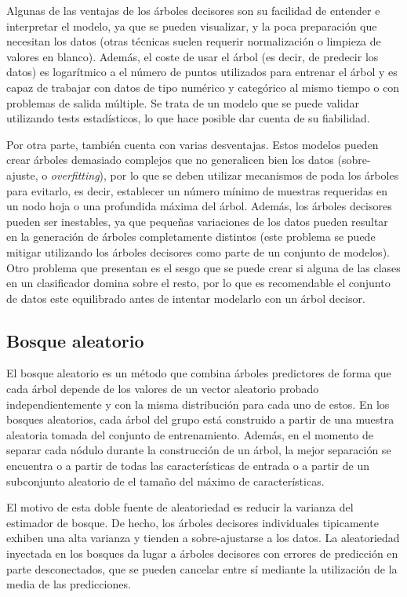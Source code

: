 Algunas de las ventajas de los árboles decisores son su facilidad de entender e interpretar el modelo, ya que se pueden visualizar, y la poca preparación que necesitan los datos (otras técnicas suelen requerir normalización o limpieza de valores en blanco).
Además, el coste de usar el árbol (es decir, de predecir los datos) es logarítmico a el número de puntos utilizados para entrenar el árbol y es capaz de trabajar con datos de tipo numérico y categórico al mismo tiempo o con problemas de salida múltiple.
Se trata de un modelo que se puede validar utilizando tests estadísticos,
lo que hace posible dar cuenta de su fiabilidad.

Por otra parte, también cuenta con varias desventajas.
Estos modelos pueden crear árboles demasiado complejos que no generalicen bien los datos (sobre-ajuste, o \emph{overfitting}), por lo que se deben utilizar mecanismos de poda los árboles para evitarlo, es decir, establecer un número mínimo de muestras requeridas en un nodo hoja o una profundida máxima del árbol.
Además, los árboles decisores pueden ser inestables, ya que pequeñas variaciones de los datos pueden resultar en la generación de árboles completamente distintos (este problema se puede mitigar utilizando los árboles decisores como parte de un conjunto de modelos).
Otro problema que presentan es el sesgo que se puede crear si alguna de las clases en un clasificador domina sobre el resto, por lo que es recomendable el conjunto de datos este equilibrado antes de intentar modelarlo con un árbol decisor.

\subsection{Bosque aleatorio}


El bosque aleatorio es un método que combina árboles predictores de forma que cada árbol depende de los valores de un vector aleatorio probado independientemente y con la misma distribución para cada uno de estos.
En los bosques aleatorios, cada árbol del grupo está construido a partir de una muestra aleatoria tomada del conjunto de entrenamiento.
Además, en el momento de separar cada nódulo durante la construcción de un árbol, la mejor separación se encuentra o a partir de todas las características de entrada o a partir de un subconjunto aleatorio de el tamaño del máximo de características.

El motivo de esta doble fuente de aleatoriedad es reducir la varianza del estimador de bosque.
De hecho, los árboles decisores individuales tipicamente exhiben una alta varianza y tienden a sobre-ajustarse a los datos.
La aleatoriedad inyectada en los bosques da lugar a árboles decisores con errores de predicción en parte desconectados, 
que se pueden cancelar entre sí mediante la utilización de la media de las predicciones.

